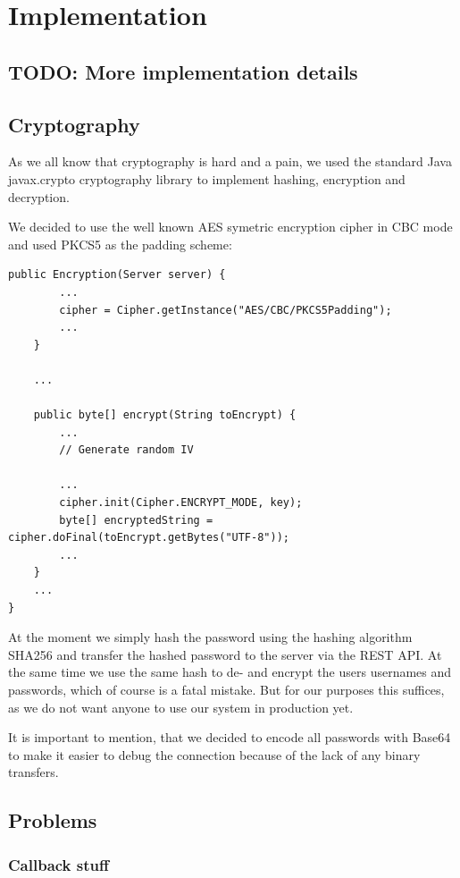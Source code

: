 \documentclass{report}
\begin{document}
\section{Implementation}

\subsection{TODO: More implementation details}

\subsection{Cryptography}
As we all know that cryptography is hard and a pain, we used the standard Java javax.crypto cryptography library to implement hashing, encryption and decryption.

We decided to use the well known AES symetric encryption cipher in CBC mode and used PKCS5 as the padding scheme:

\begin{lstlisting}
public Encryption(Server server) {
        ...
        cipher = Cipher.getInstance("AES/CBC/PKCS5Padding");
        ...
    }
    
    ...
    
    public byte[] encrypt(String toEncrypt) {
        ...
        // Generate random IV
        
		...        
        cipher.init(Cipher.ENCRYPT_MODE, key);
        byte[] encryptedString = cipher.doFinal(toEncrypt.getBytes("UTF-8"));
        ...
    }
    ...
}
\end{lstlisting}

At the moment we simply hash the password using the hashing algorithm SHA256 and transfer the hashed password to the server via the REST API. At the same time we use the same hash to de- and encrypt the users usernames and passwords, which of course is a fatal mistake. But for our purposes this suffices, as we do not want anyone to use our system in production yet.

It is important to mention, that we decided to encode all passwords with Base64 to make it easier to debug the connection because of the lack of any binary transfers.

\subsection{Problems}
\subsubsection{Callback stuff}
\end{document}
